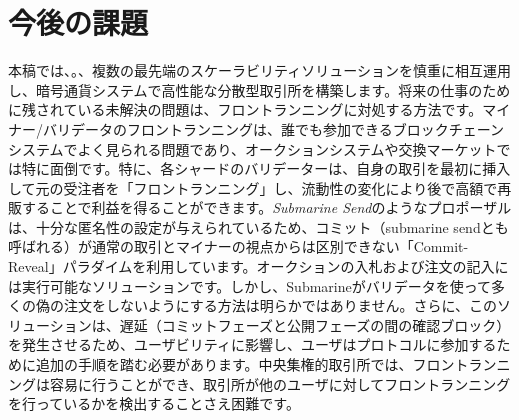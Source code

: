 \section{今後の課題}
本稿では、。、複数の最先端のスケーラビリティソリューションを慎重に相互運用し、暗号通貨システムで高性能な分散型取引所を構築します。将来の仕事のために残されている未解決の問題は、フロントランニングに対処する方法です。マイナー/バリデータのフロントランニングは、誰でも参加できるブロックチェーンシステムでよく見られる問題であり、オークションシステムや交換マーケットでは特に面倒です。特に、各シャードのバリデーターは、自身の取引を最初に挿入して元の受注者を「フロントランニング」し、流動性の変化により後で高額で再販することで利益を得ることができます。\textit{Submarine Send}\cite{submarine}のようなプロポーザルは、十分な匿名性の設定が与えられているため、コミット（submarine sendとも呼ばれる）が通常の取引とマイナーの視点からは区別できない「Commit-Reveal」パラダイムを利用しています。オークションの入札および注文の記入には実行可能なソリューションです。しかし、Submarineがバリデータを使って多くの偽の注文をしないようにする方法は明らかではありません。さらに、このソリューションは、遅延（コミットフェーズと公開フェーズの間の確認ブロック）を発生させるため、ユーザビリティに影響し、ユーザはプロトコルに参加するために追加の手順を踏む必要があります。中央集権的取引所では、フロントランニングは容易に行うことができ、取引所が他のユーザに対してフロントランニングを行っているかを検出することさえ困難です。
